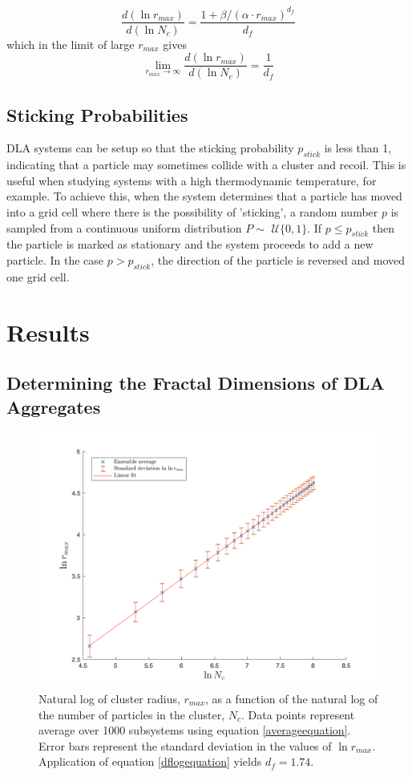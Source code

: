 \documentclass[11pt]{iopart}
\begin{document}
\begin{equation}
\frac{d(\ln r_{max})}{d(\ln N_c)} = \frac{1 + \beta/(\alpha \cdot r_{max})^{d_f}}{d_f}
\end{equation} 
which in the limit of large $r_{max}$ gives
\begin{equation}
\label{dflogequation}
\lim_{r_{max}\to\infty} \frac{d(\ln r_{max})}{d(\ln N_c)}  = \frac{1}{d_f}
\end{equation}

\subsection{Sticking Probabilities}

DLA systems can be setup so that the sticking probability $p_{stick}$ is less than 1, indicating that a particle may sometimes collide with a cluster and recoil. This is useful when studying systems with a high thermodynamic temperature, for example. To achieve this, when the system determines that a particle has moved into a grid cell where there is the possibility of 'sticking', a random number $p$ is sampled from a continuous uniform distribution $P \sim$ $\mathcal{U}\{0, 1\}$. If $p \leq p_{stick}$ then the particle is marked as stationary and the system proceeds to add a new particle. In the case $p > p_{stick}$, the direction of the particle is reversed and moved one grid cell. 

\section{Results}

\subsection{Determining the Fractal Dimensions of DLA Aggregates}

\begin{figure}[t]
  \centering
  \includegraphics[width=0.7\linewidth]{images/loggraph.png}
  \caption{Natural log of cluster radius, $r_{max}$, as a function of the natural log of the number of particles in the cluster, $N_c$. Data points represent average over 1000 subsystems using equation \ref{averageequation}. Error bars represent the standard deviation in the values of $\ln r_{max}$. Application of equation \ref{dflogequation} yields $d_f = 1.74$.}
  \label{fig:loggraph}
\end{figure}
\end{document}
